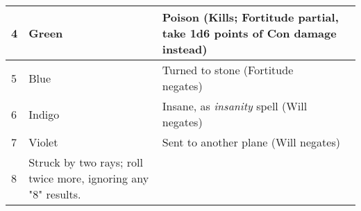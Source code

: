 \begin{longtable}{llllll}
{\begin{minipage}[t]{0.289in}
4\end{minipage}} & \multicolumn{1}{p{0.799in}|}{\begin{minipage}[t]{0.799in}\raggedright
Green\end{minipage}} & \multicolumn{4}{p{3.413in}|}{\begin{minipage}[t]{3.413in}\raggedright
Poison (Kills; Fortitude partial, take 1d6 points of Con damage instead)\end{minipage}}\\
\hline
\multicolumn{1}{p{0.055in}|}{\begin{minipage}[t]{0.055in}\raggedright
5\end{minipage}} & \multicolumn{1}{p{0.055in}|}{\begin{minipage}[t]{0.055in}\raggedright
Blue\end{minipage}} & \multicolumn{1}{p{0.055in}|}{\begin{minipage}[t]{0.055in}\raggedright
Turned to stone (Fortitude negates)\end{minipage}}\\
\hline
\multicolumn{1}{|p{0.289in}|}{\begin{minipage}[t]{0.289in}\raggedright
6\end{minipage}} & \multicolumn{1}{p{0.799in}|}{\begin{minipage}[t]{0.799in}\raggedright
Indigo\end{minipage}} & \multicolumn{4}{p{3.413in}|}{\begin{minipage}[t]{3.413in}\raggedright
Insane, as \textit{insanity} spell (Will negates)\end{minipage}}\\
\hline
\multicolumn{1}{|p{0.289in}|}{\begin{minipage}[t]{0.289in}\raggedright
7\end{minipage}} & \multicolumn{1}{p{0.799in}|}{\begin{minipage}[t]{0.799in}\raggedright
Violet\end{minipage}} & \multicolumn{4}{p{3.413in}|}{\begin{minipage}[t]{3.413in}\raggedright
Sent to another plane (Will negates)\end{minipage}}\\
\hline
\multicolumn{1}{|p{0.289in}|}{\begin{minipage}[t]{0.289in}\raggedright
8\end{minipage}} & \multicolumn{1}{p{0.799in}|}{\begin{minipage}[t]{0.799in}\raggedright
Struck by two rays; roll twice more, ignoring any "8" results.\end{minipage}}\\
\hline
\end{longtable}

